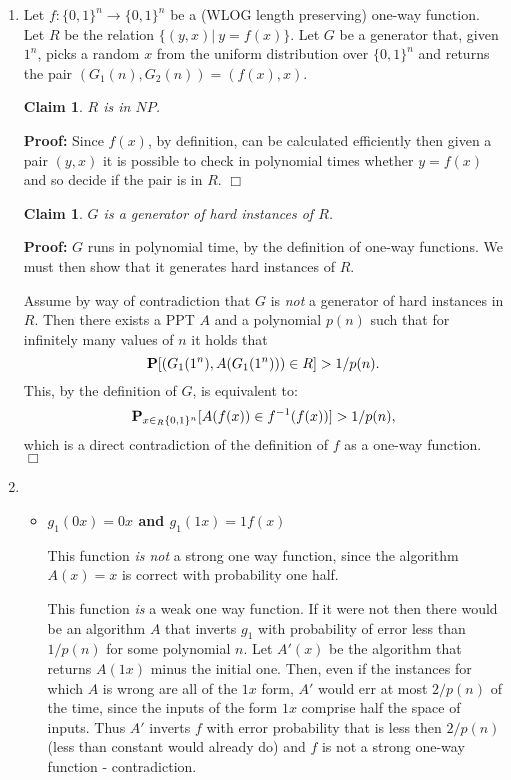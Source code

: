 \documentclass[11pt]{article} \usepackage{amssymb}
\newtheorem{claim}[theorem]{Claim}
\newenvironment{proof}{\noindent \textbf{Proof:}}{$\Box$}
\begin{document}
\begin{enumerate}
\item Let $f:\{0,1\}^n\to\{0,1\}^n$ be a (WLOG length preserving) 
  one-way function. Let $R$ be the relation
  $\{(y,x)|\:y=f(x)\}$. Let $G$ be a generator that, given $1^n$, picks a random
  $x$ from the uniform distribution over $\{0,1\}^n$ and returns the pair
  $(G_1(n),G_2(n))=(f(x),x)$.
  
  \begin{claim}
    $R$ is in $NP$.
  \end{claim}
  \begin{proof}
    Since $f(x)$, by definition, can be calculated efficiently then given a pair
    $(y,x)$ it is possible to check in polynomial times whether $y=f(x)$ and so 
    decide if the pair is in $R$.
  \end{proof}
  \begin{claim}
    $G$ is a generator of hard instances of $R$.
  \end{claim}
  \begin{proof}
    $G$ runs in polynomial time, by the definition of one-way functions. We 
    must then show that it generates hard instances of $R$.
    
    Assume by way of contradiction that $G$ is {\em not} a generator of hard
    instances in $R$. Then there exists a PPT $A$ and a polynomial $p(n)$ such
    that for infinitely many values of $n$ it holds that
    $$\P[(G_1(1^n), A(G_1(1^n)))\in R]>1/p(n).$$
    This, by the definition of $G$, is equivalent to:
    $$\P_{x\in_R\{0,1\}^n}[A(f(x))\in f^{-1}(f(x))]>1/p(n),$$
    which is a direct contradiction of the definition of $f$ as a one-way 
    function.
  \end{proof}
  
\item
  \begin{itemize}
  \item {\bf $g_1(0x) = 0x$ and $g_1(1x) = 1f(x)$}

    This function {\em is not} a strong one way function, since the algorithm
    $A(x)=x$ is correct with probability one half. 

    This function {\em is } a weak one way function. If it were not then there
    would be an algorithm $A$ that inverts $g_1$ with probability of error 
    less than $1/p(n)$ for some polynomial $n$. Let $A'(x)$ be the algorithm
    that returns $A(1x)$ minus the initial one. Then, even if the instances for
    which $A$ is wrong are all of the $1x$ form, $A'$ would err at most 
    $2/p(n)$ of the time, since the inputs of the form $1x$ comprise half the 
    space of inputs. Thus $A'$ inverts $f$ with
    error probability that is less then $2/p(n)$ (less than constant would 
    already do) and $f$ is not a strong one-way function - contradiction.


\end{itemize}
\end{enumerate}
\end{document}
